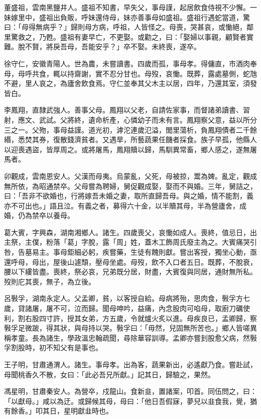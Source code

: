 \begin{pinyinscope}
董盛祖，雲南黑鹽井人。盛祖不知書，早失父，事母謹，起居飲食侍視不少懈。一妹嫁里中，盛祖出負販，呼妹還侍母，妹亦善事母如盛祖。盛祖行遇蛇當道，驚曰：「母得無病乎？」歸則母方病，呼祖，人皆怪之。母喪，哭甚哀，或慟絕，鄰里驚救之，乃甦。盛祖有妻早亡，不更娶。或勸之，曰：「娶婦以事親，顧賢者實難。脫不賢，將戾吾母，吾能安乎？」卒不娶。未終喪，遂卒。

徐守仁，安徽青陽人。世為農，未嘗讀書。四歲而孤，事母孝。得傭直，市酒肉奉母，母呼共食，輒以持齋謝，實不忍分甘也。母歿，哀慟。既葬，露處墓側，蛇虺不避，里人哀之，為廬舍飲食焉。守仁並奉其父木主以居，四年，乃還其室，須發皆白。

李鳳翔，直隸武強人。善事父母。鳳翔以父老，自請佐家事，而督諸弟讀書、習射，應文、武試。父將終，遺命析產，心憐幼子而未有言。鳳翔察父意，益以所分三之一。父歾，事母益謹。道光初，滹沱連歲氾溢，閭里蕩析，負鳳翔債者二千餘緡，悉焚其券，復散錢濟貧者。又遇旱，所藝蔬果任饑者採食。族子早孤，他縣人以迎喪遇盜，皆厚周之。或將屠馬，鳳翔贖以歸，馬馴異常畜，鄉人感之，遂無屠馬者。

卯觀成，雲南恩安人。父漢而母夷。烏蒙亂，父死，母被掠，鬻為婢。亂定，觀成無所依，為昭通禁卒。父母嘗為聘婦，舅促觀成娶，娶而不與婚。三年，舅詰之，曰：「吾非不欲婚也，行將嫁吾未婚之妻，取所直歸吾母。與之婚，情不能割，義亦不可出也。」語且泣。有義之者，募得六十金，以半贖其母，半為營廬舍，成婚，仍為禁卒以養母。

葛大賓，字興森，湖南湘鄉人。諸生。四歲喪父，哀慟如成人。喪終，值忌日，出主祭，主僕，粉落「葛」字脫，露「周」姓，蓋木工飾周氏廢主為之。大賓痛哭引咎，告墓易主。事母鉅細必躬，疾嘗藥，生徒有餽則獻。嘗出客授，獨坐心動，亟還呼母，母出，屋後山遽頹，壓母坐處。母歿，飲不入口者五日。既葬，不脫衰，腰以下縷皆盡。喪終，祭必哀，兄弟既分居，財盡，大賓復與同居，通財無所私。歿則庀其喪，無子，為立後。

呂斅孚，湖南永定人。父孟卿，貧，以客授自給。母病將殆，思肉食，斅孚方七歲，貸諸屠，屠不可，泣而歸。聞母呻吟，益痛，內念股肉可啗母，取廚刀礪使利，割右股四寸許，授其女弟，方五歲，令就爐火炙以進。母疾良已，孟卿歸，察斅孚足微跛，得其狀，與母持以哭。斅孚曰：「毋然，兒固無所苦也。」鄉人皆嗟異稱孝童。長為諸生，學政溫忠翰疏聞，尋除華容訓導。孟卿亦嘗刲股愈父病，然斅孚割股時，初不知父有是事也。

王子明，甘肅通渭人。諸生。事母孝。出為客，蔬果新出，必遙獻乃食。嘗赴試，母聞桃香久不散，女曰：「此必吾兄所獻。」記其日，歸驗之，果然。

馮星明，甘肅秦安人。為營卒，戍龍山。食新韭，置諸案，叩首。同伍問之，曰：「以獻母。」咸以為迂。或歸候其母，母曰：「他日吾假寐，夢兒以韭食我，覺，猶有餘香。」叩其日，星明獻韭時也。


\end{pinyinscope}
